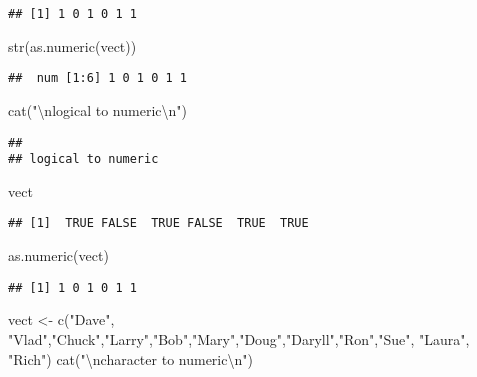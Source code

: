 \documentclass[
]{article}
\newenvironment{Shaded}{\begin{snugshade}}{\end{snugshade}}
\newcommand{\FunctionTok}[1]{\textcolor[rgb]{0.00,0.00,0.00}{#1}}
\newcommand{\NormalTok}[1]{#1}
\newcommand{\OtherTok}[1]{\textcolor[rgb]{0.56,0.35,0.01}{#1}}
\newcommand{\SpecialCharTok}[1]{\textcolor[rgb]{0.00,0.00,0.00}{#1}}
\newcommand{\StringTok}[1]{\textcolor[rgb]{0.31,0.60,0.02}{#1}}
\begin{document}
\begin{verbatim}
## [1] 1 0 1 0 1 1
\end{verbatim}

\begin{Shaded}
\begin{Highlighting}[]
\FunctionTok{str}\NormalTok{(}\FunctionTok{as.numeric}\NormalTok{(vect))}
\end{Highlighting}
\end{Shaded}

\begin{verbatim}
##  num [1:6] 1 0 1 0 1 1
\end{verbatim}

\begin{Shaded}
\begin{Highlighting}[]
\FunctionTok{cat}\NormalTok{(}\StringTok{"}\SpecialCharTok{\textbackslash{}n}\StringTok{logical to numeric}\SpecialCharTok{\textbackslash{}n}\StringTok{"}\NormalTok{)}
\end{Highlighting}
\end{Shaded}

\begin{verbatim}
## 
## logical to numeric
\end{verbatim}

\begin{Shaded}
\begin{Highlighting}[]
\NormalTok{vect}
\end{Highlighting}
\end{Shaded}

\begin{verbatim}
## [1]  TRUE FALSE  TRUE FALSE  TRUE  TRUE
\end{verbatim}

\begin{Shaded}
\begin{Highlighting}[]
\FunctionTok{as.numeric}\NormalTok{(vect)}
\end{Highlighting}
\end{Shaded}

\begin{verbatim}
## [1] 1 0 1 0 1 1
\end{verbatim}

\begin{Shaded}
\begin{Highlighting}[]
\NormalTok{vect }\OtherTok{\textless{}{-}} \FunctionTok{c}\NormalTok{(}\StringTok{"Dave"}\NormalTok{, }\StringTok{"Vlad"}\NormalTok{,}\StringTok{"Chuck"}\NormalTok{,}\StringTok{"Larry"}\NormalTok{,}\StringTok{"Bob"}\NormalTok{,}\StringTok{"Mary"}\NormalTok{,}\StringTok{"Doug"}\NormalTok{,}\StringTok{"Daryll"}\NormalTok{,}\StringTok{"Ron"}\NormalTok{,}\StringTok{"Sue"}\NormalTok{, }\StringTok{"Laura"}\NormalTok{, }\StringTok{"Rich"}\NormalTok{)}
\FunctionTok{cat}\NormalTok{(}\StringTok{"}\SpecialCharTok{\textbackslash{}n}\StringTok{character to numeric}\SpecialCharTok{\textbackslash{}n}\StringTok{"}\NormalTok{)}
\end{Highlighting}
\end{Shaded}
\end{document}
